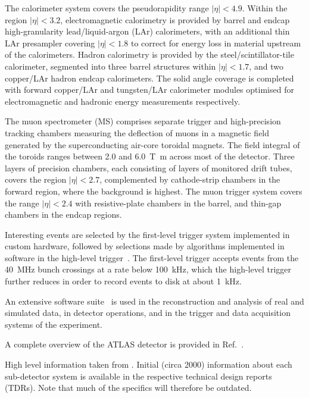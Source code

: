 The calorimeter system covers the pseudorapidity range \(|\eta| < 4.9\).
Within the region \(|\eta|< 3.2\), electromagnetic calorimetry is provided by barrel and 
endcap high-granularity lead/liquid-argon (LAr) calorimeters,
with an additional thin LAr presampler covering \(|\eta| < 1.8\)
to correct for energy loss in material upstream of the calorimeters.
Hadron calorimetry is provided by the steel/scintillator-tile calorimeter,
segmented into three barrel structures within \(|\eta| < 1.7\), and two copper/LAr hadron endcap calorimeters.
The solid angle coverage is completed with forward copper/LAr and tungsten/LAr calorimeter modules
optimised for electromagnetic and hadronic energy measurements respectively.

The muon spectrometer (MS) comprises separate trigger and
high-precision tracking chambers measuring the deflection of muons in a magnetic field generated by the superconducting air-core toroidal magnets.
The field integral of the toroids ranges between \num{2.0} and \SI{6.0}{\tesla\metre}
across most of the detector. 
Three layers of precision chambers, each consisting of layers of monitored drift tubes, covers the region \(|\eta| < 2.7\),
complemented by cathode-strip chambers in the forward region, where the background is highest.
The muon trigger system covers the range \(|\eta| < 2.4\) with resistive-plate chambers in the barrel, and thin-gap chambers in the endcap regions.

Interesting events are selected by the first-level trigger system implemented in custom hardware,
followed by selections made by algorithms implemented in software in the high-level trigger~\cite{TRIG-2016-01}. 
The first-level trigger accepts events from the \SI{40}{\MHz} bunch crossings at a rate below \SI{100}{\kHz},
which the high-level trigger further reduces in order to record events to disk at about \SI{1}{\kHz}.

An extensive software suite~\cite{ATL-SOFT-PUB-2021-001} is used in the reconstruction and analysis of real
and simulated data, in detector operations, and in the trigger and data acquisition systems of the experiment.

A complete overview of the ATLAS detector is provided in Ref.~\cite{PERF-2007-01}.






High level information taken from \cite{PERF-2007-01}. Initial (circa 2000) information about each sub-detector system is available in the respective technical design reports (TDRs). Note that much of the specifics will therefore be outdated.

